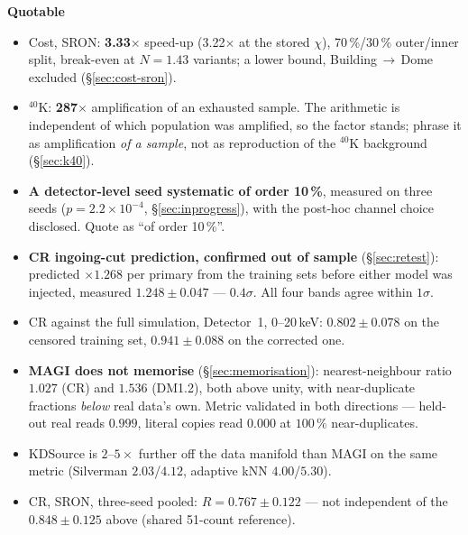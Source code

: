 \documentclass[11pt,a4paper]{article}
\newenvironment{callout}[3]%
{\par\medskip\noindent
 \def\calloutframe{#1}\def\calloutback{#2}%
 \setlength{\fboxrule}{0.9pt}\setlength{\fboxsep}{8pt}%
 \begin{lrbox}{\calloutbox}%
 \begin{minipage}{\dimexpr\textwidth-2\fboxsep-2\fboxrule\relax}%
 \setlength{\parskip}{4pt}%
 \textcolor{#1}{\textbf{#3}}\par\nobreak\smallskip}
{\end{minipage}\end{lrbox}%
 \fcolorbox{\calloutframe}{\calloutback}{\usebox{\calloutbox}}%
 \par\medskip}
\begin{document}
\begin{callout}{ok}{green!4}{Quotable}
\begin{itemize}[nosep]
  \item Cost, SRON: \textbf{3.33$\times$} speed-up (3.22$\times$ at the stored
        $\chi$), 70\,\%/30\,\% outer/inner split, break-even at $N = 1.43$
        variants; a lower bound, Building\,$\to$\,Dome excluded
        (\S\ref{sec:cost-sron}).
  \item $^{40}$K: \textbf{287$\times$} amplification of an exhausted sample.
        The arithmetic is independent of which population was amplified, so the
        factor stands; phrase it as amplification \emph{of a sample}, not as
        reproduction of the $^{40}$K background (\S\ref{sec:k40}).
  \item \textbf{A detector-level seed systematic of order 10\,\%}, measured on
        three seeds ($p = 2.2\times10^{-4}$, \S\ref{sec:inprogress}), with the
        post-hoc channel choice disclosed. Quote as ``of order 10\,\%''.
  \item \textbf{CR ingoing-cut prediction, confirmed out of sample}
        (\S\ref{sec:retest}): predicted $\times1.268$ per primary from the
        training sets before either model was injected, measured
        $\mathbf{1.248 \pm 0.047}$ --- $0.4\sigma$. All four bands agree within
        $1\sigma$.
  \item CR against the full simulation, Detector~1, 0--20\,keV:
        $0.802 \pm 0.078$ on the censored training set,
        $\mathbf{0.941 \pm 0.088}$ on the corrected one.
  \item \textbf{MAGI does not memorise} (\S\ref{sec:memorisation}):
        nearest-neighbour ratio $1.027$ (CR) and $1.536$ (DM1.2), both above
        unity, with near-duplicate fractions \emph{below} real data's own.
        Metric validated in both directions --- held-out real reads $0.999$,
        literal copies read $0.000$ at $100\,\%$ near-duplicates.
  \item KDSource is $2$--$5\times$ further off the data manifold than MAGI on the
        same metric (Silverman $2.03$/$4.12$, adaptive kNN $4.00$/$5.30$).
  \item CR, SRON, three-seed pooled: $R = 0.767 \pm 0.122$ --- not independent
        of the $0.848 \pm 0.125$ above (shared 51-count reference).
\end{itemize}
\end{callout}
\end{document}
